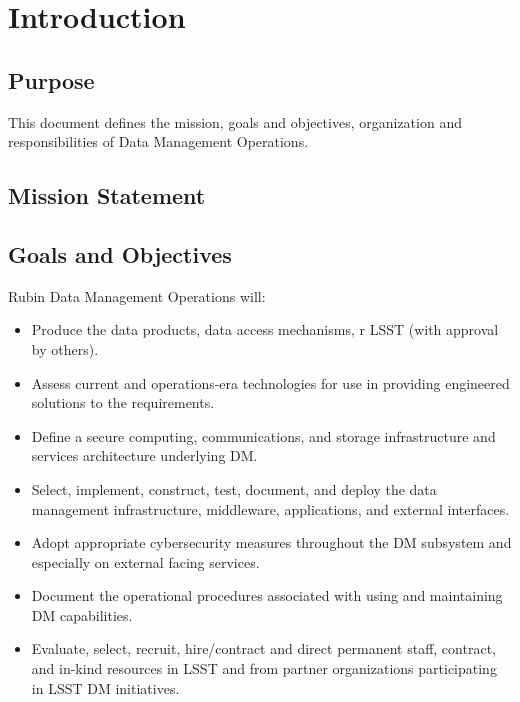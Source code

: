 \section {Introduction}\label{sec:intro}
\subsection{Purpose}
This document defines the mission, goals and objectives, organization and responsibilities of
 \VRO Data Management Operations.

\subsection{Mission Statement}


\subsection{Goals and Objectives}
Rubin Data Management Operations will:
\begin{itemize}
\item Produce the data products, data access mechanisms, r LSST (with approval by others).
\item Assess current and operations-era technologies for use in providing engineered solutions to the requirements.
\item Define a secure computing, communications, and storage infrastructure and services architecture underlying DM.
\item Select, implement, construct, test, document, and deploy the data management infrastructure, middleware, applications, and external interfaces.
\item Adopt appropriate cybersecurity measures throughout the DM subsystem and especially on external facing services.
\item Document the operational procedures associated with using and maintaining DM capabilities.
\item Evaluate, select, recruit, hire/contract and direct permanent staff, contract, and in-kind resources in LSST and from partner organizations participating in LSST DM initiatives.

\end{itemize}

